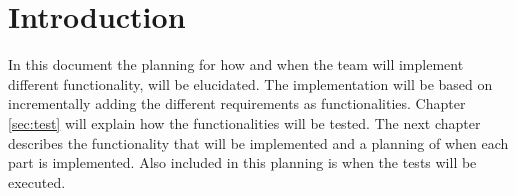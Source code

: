 \chapter{Introduction}
In this document the planning for how and when the team will implement different functionality, will be elucidated. The implementation will be based on incrementally adding the different requirements as functionalities. Chapter \ref{sec:test} will explain how the functionalities will be tested. The next chapter describes the functionality that will be implemented and a planning of when each part is implemented. Also included in this planning is when the tests will be executed.